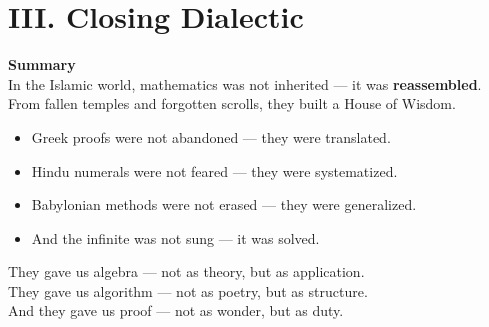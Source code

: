 \documentclass[9pt]{article}
\begin{document}
\begin{center}
\end{center}


\newpage

\section*{III. Closing Dialectic}

\textbf{Summary} \\

In the Islamic world, mathematics was not inherited — it was \textbf{reassembled}. \\

From fallen temples and forgotten scrolls, they built a House of Wisdom.

\begin{itemize}
    \item Greek proofs were not abandoned — they were translated.
    \item Hindu numerals were not feared — they were systematized.
    \item Babylonian methods were not erased — they were generalized.
    \item And the infinite was not sung — it was solved.
\end{itemize}

They gave us algebra — not as theory, but as application.  \\

They gave us algorithm — not as poetry, but as structure.  \\

And they gave us proof — not as wonder, but as duty.
\end{document}
